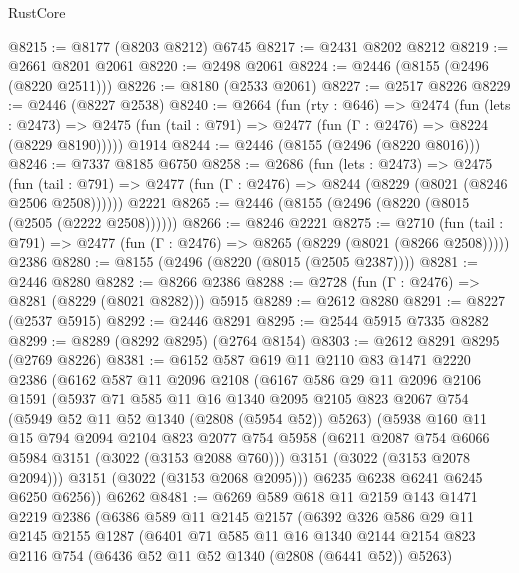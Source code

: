 \begin{lexlean}{RustCore}
\begin{coremodule}
@8215 := @8177 (@8203 @8212) @6745
@8217 := @2431 @8202 @8212
@8219 := @2661 @8201 @2061
@8220 := @2498 @2061
@8224 := @2446 (@8155 (@2496 (@8220 @2511)))
@8226 := @8180 (@2533 @2061)
@8227 := @2517 @8226
@8229 := @2446 (@8227 @2538)
@8240 := @2664
    (fun (rty : @646) =>
    @2474
      (fun (lets : @2473) =>
      @2475 (fun (tail : @791) => @2477 (fun (Γ : @2476) => @8224 (@8229 @8190)))))
    @1914
@8244 := @2446 (@8155 (@2496 (@8220 @8016)))
@8246 := @7337 @8185 @6750
@8258 := @2686
    (fun (lets : @2473) =>
    @2475
      (fun (tail : @791) => @2477 (fun (Γ : @2476) => @8244 (@8229 (@8021 (@8246 @2506 @2508))))))
    @2221
@8265 := @2446 (@8155 (@2496 (@8220 (@8015 (@2505 (@2222 @2508))))))
@8266 := @8246 @2221
@8275 := @2710
    (fun (tail : @791) => @2477 (fun (Γ : @2476) => @8265 (@8229 (@8021 (@8266 @2508)))))
    @2386
@8280 := @8155 (@2496 (@8220 (@8015 (@2505 @2387))))
@8281 := @2446 @8280
@8282 := @8266 @2386
@8288 := @2728 (fun (Γ : @2476) => @8281 (@8229 (@8021 @8282))) @5915
@8289 := @2612 @8280
@8291 := @8227 (@2537 @5915)
@8292 := @2446 @8291
@8295 := @2544 @5915 @7335 @8282
@8299 := @8289 (@8292 @8295) (@2764 @8154)
@8303 := @2612 @8291 @8295 (@2769 @8226)
@8381 := @6152
    @587
    @619
    @11
    @2110
    @83
    @1471
    @2220
    @2386
    (@6162
      @587
      @11
      @2096
      @2108
      (@6167
        @586
        @29
        @11
        @2096
        @2106
        @1591
        (@5937
          @71
          @585
          @11
          @16
          @1340
          @2095
          @2105
          @823
          @2067
          @754
          (@5949 @52 @11 @52 @1340 (@2808 (@5954 @52)) @5263)
          (@5938
            @160
            @11
            @15
            @794
            @2094
            @2104
            @823
            @2077
            @754
            @5958
            (@6211 @2087 @754 @6066 @5984 @3151 (@3022 (@3153 @2088 @760)))
            @3151
            (@3022 (@3153 @2078 @2094)))
          @3151
          (@3022 (@3153 @2068 @2095)))
        @6235
        @6238
        @6241
        @6245
        @6250
        @6256))
    @6262
@8481 := @6269
    @589
    @618
    @11
    @2159
    @143
    @1471
    @2219
    @2386
    (@6386
      @589
      @11
      @2145
      @2157
      (@6392
        @326
        @586
        @29
        @11
        @2145
        @2155
        @1287
        (@6401
          @71
          @585
          @11
          @16
          @1340
          @2144
          @2154
          @823
          @2116
          @754
          (@6436 @52 @11 @52 @1340 (@2808 (@6441 @52)) @5263)

\end{coremodule}
\end{lexlean}
